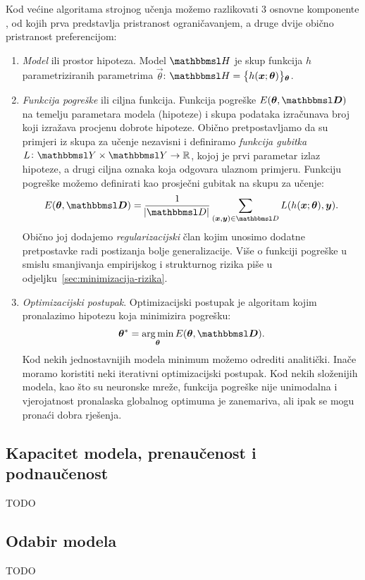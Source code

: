 \documentclass[utf8, diplomski, lmodern]{fer}
\begin{document}
Kod većine algoritama strojnog učenja možemo razlikovati 3 osnovne komponente \citep{Snajder:2014:SU}, od kojih prva predstavlja pristranost ograničavanjem, a druge dvije obično pristranost preferencijom:
\begin{enumerate}
	\item \emph{Model} ili prostor hipoteza. Model $\set H$ je skup funkcija $h$  parametriziranih parametrima $\vec\theta$: $\set H=\cbr{h(\vec x;\vec{\theta})}_{\vec{\theta}}$.
	\item \emph{Funkcija pogreške} ili ciljna funkcija. Funkcija pogreške $E(\vec{\theta,\set D})$ na temelju parametara modela (hipoteze) i skupa podataka izračunava broj koji izražava procjenu dobrote hipoteze. Obično pretpostavljamo da su primjeri iz skupa za učenje nezavisni i definiramo \emph{funkcija gubitka} $\funcdef{L}{\set Y\times\set Y}{\R}$, kojoj je prvi parametar izlaz hipoteze, a drugi ciljna oznaka koja odgovara ulaznom primjeru. Funkciju pogreške možemo definirati kao prosječni gubitak na skupu za učenje:
	\begin{align}
	E(\vec{\theta,\set D})=\frac{1}{\envert{\set D}}\sum_{(\vec x,\vec y)\in\set D} L(h(\vec x;\vec{\theta}),\vec y) \text{.}
	\end{align}
	Obično joj dodajemo \emph{regularizacijski} član kojim unosimo dodatne pretpostavke radi postizanja bolje generalizacije. Više o funkciji pogreške u smislu smanjivanja empirijskog i strukturnog rizika piše u odjeljku~\ref{sec:minimizacija-rizika}.
	\item \emph{Optimizacijski postupak}. Optimizacijski postupak je algoritam kojim pronalazimo hipotezu koja minimizira pogrešku:
	\begin{align}
	\vec\theta^* = \argmin_{\vec{\theta}} E(\vec{\theta,\set D}) \text{.}
	\end{align}
	Kod nekih jednostavnijih modela minimum možemo odrediti analitički. Inače moramo koristiti neki iterativni optimizacijski postupak. Kod nekih složenijih modela, kao što su neuronske mreže, funkcija pogreške nije unimodalna i vjerojatnost pronalaska globalnog optimuma je zanemariva, ali ipak se mogu pronaći dobra rješenja.
\end{enumerate}

\subsection{Kapacitet modela, prenaučenost i podnaučenost}
TODO

\subsection{Odabir modela}
TODO
\cite{Murray:2005:NEBOR}
\end{document}
